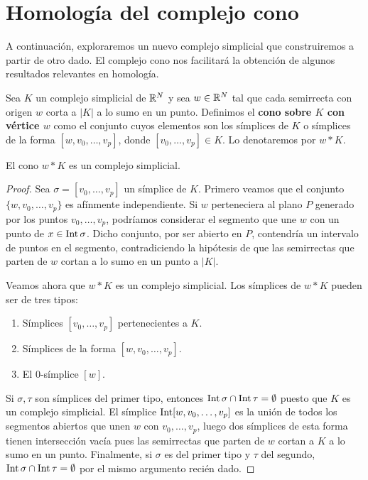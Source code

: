 \section{Homología del complejo cono}
A continuación, exploraremos un nuevo complejo simplicial que construiremos a partir de otro dado. El complejo cono nos facilitará la obtención de algunos resultados relevantes en homología.
\begin{definicion}
	Sea $K$ un complejo simplicial de $\mathbb{R}^N$ y sea $w \in \mathbb{R}^N$ tal que cada semirrecta con origen $w$ corta a $|K|$ a lo sumo en un punto. Definimos el \textbf{cono sobre $K$ con vértice $w$} como el conjunto cuyos elementos son los símplices de $K$ o símplices de la forma $[w,v_0,\dots,v_p]$, donde $[v_0, \dots, v_p] \in K$. Lo denotaremos por $w \ast K$.
\end{definicion}
\begin{lema}
	El cono $w \ast K$ es un complejo simplicial.
\end{lema}
\begin{proof}
	Sea $\sigma = [v_0,\dots,v_p]$ un símplice de $K$. Primero veamos que el conjunto $\{w,v_0,\dots,v_p\}$ es afínmente independiente. Si $w$ perteneciera al plano $P$ generado por los puntos $v_0,\dots,v_p$, podríamos considerar el segmento que une $w$ con un punto de $x \in \operatorname{Int} \sigma$. Dicho conjunto, por ser abierto en $P$, contendría un intervalo de puntos en el segmento, contradiciendo la hipótesis de que las semirrectas que parten de $w$ cortan a lo sumo en un punto a $|K|$.
	
	Veamos ahora que $w \ast K$ es un complejo simplicial. Los símplices de $w \ast K$ pueden ser de tres tipos:
	\begin{enumerate}
		\item Símplices $[v_0,\dots, v_p]$ pertenecientes a $K$.
		\item Símplices de la forma $[w,v_0,\dots, v_p]$.
		\item El $0$-símplice $[w]$.
	\end{enumerate}
	Si $\sigma,\tau$ son símplices del primer tipo, entonces $\operatorname{Int} \sigma \cap \operatorname{Int} \tau = \emptyset$ puesto que $K$ es un complejo simplicial. El símplice $\operatorname{Int} [w,v_0,\dots,v_p]$ es la unión de todos los segmentos abiertos que unen $w$ con $v_0,\dots, v_p$, luego dos símplices de esta forma tienen intersección vacía pues las semirrectas que parten de $w$ cortan a $K$ a lo sumo en un punto. Finalmente, si $\sigma$ es del primer tipo y $\tau$ del segundo, $\operatorname{Int} \sigma \cap \operatorname{Int} \tau = \emptyset$ por el mismo argumento recién dado.
\end{proof}

